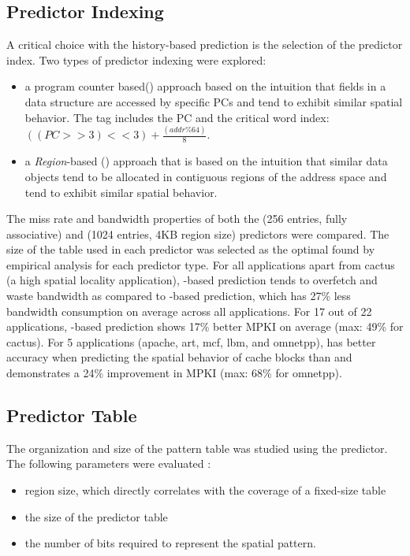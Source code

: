 {{\subsection{Predictor Indexing} 

A critical choice with the history-based prediction is the selection of the predictor index. Two types of predictor indexing were explored:
\begin{itemize}[noitemsep]
  \item a program counter based() approach\cite{chen-hpca-2004} based on the intuition that fields in a data structure are accessed by specific PCs and tend to exhibit similar spatial behavior. The tag includes the PC and the critical word index: $((PC>>3)<<3)+\frac{(addr\%64)}{8}$.
  \item a \textit{Region}-based () approach that is based on the intuition that similar data objects tend to be allocated in contiguous  regions of the address space and tend to exhibit similar spatial behavior. 
\end{itemize}

The miss rate and bandwidth properties of both the   (256 entries, fully associative) and  (1024 entries, 4KB region size) predictors were compared. The size of the table used in each predictor was selected as the optimal found by empirical analysis for each predictor type.  For all applications apart from cactus (a high spatial locality application), -based prediction tends to overfetch and waste bandwidth as compared to -based prediction, which has 27\% less bandwidth consumption on average across all applications. For 17 out of 22 applications, -based prediction shows 17\%  better MPKI on average (max: 49\% for cactus). For 5 applications (apache, art, mcf, lbm, and omnetpp),  has better accuracy when predicting the spatial behavior of cache blocks than  and demonstrates a 24\% improvement in MPKI (max: 68\% for omnetpp).

\subsection{Predictor Table}

The organization and size of the pattern table was studied using the  predictor. The following parameters were evaluated :
\begin{itemize}[noitemsep]
  \item region size, which directly correlates with the coverage of a fixed-size table
  \item the size of the predictor table
  \item the number of bits required to represent the spatial pattern.
\end{itemize}

}}
